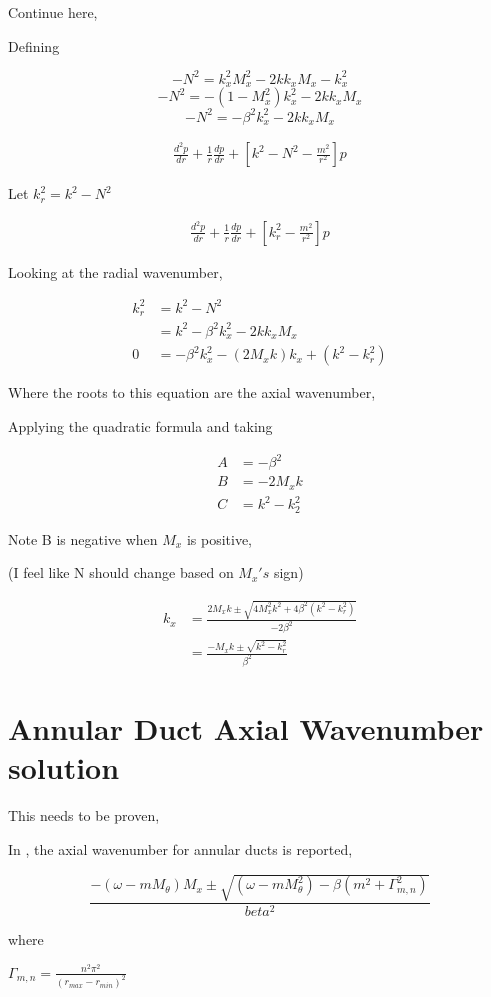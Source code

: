 Continue here,


Defining 

$$- N^2 = k_x^2 M_x^2 - 2 k k_x M_x - k_x^2 $$
$$-N^2 = -(1 -  M_x^2)k_x^2 - 2 k k_x M_x  $$
$$-N^2 =  -\beta^2 k_x^2 - 2 k k_x M_x  $$


\begin{align*}
    \frac{ d^2 p}{d r} +
    \frac{1}{r} 
    \frac{d p}{d r} + \left[ 
    k^2 - N^2 - \frac{m^2}{r^2}  \right]p 
\end{align*}

Let $k_r^2 = k^2 - N^2$


\begin{align*}
    \frac{ d^2 p}{d r} +
    \frac{1}{r} 
    \frac{d p}{d r} + \left[ 
    k_r^2  - \frac{m^2}{r^2}  \right]p 
\end{align*}

Looking at the radial wavenumber,

\begin{align*}
    k_r^2 &= k^2 - N^2 \\
          &= k^2-\beta^2 k_x^2 - 2 k k_x M_x \\
    0 &=  -\beta ^2 k_x ^2 -  \left( 2M_x k \right)k_x +(k^2 - k_r^2)
\end{align*}

Where the roots to this equation are the axial wavenumber,


Applying the quadratic formula and taking 

\begin{align*}
    A &= - \beta^2 \\
    B &= - 2M_x k\\
    C &= k^2 - k_2^2
\end{align*} 

Note B is negative when $M_x$ is positive,

(I feel like N should change based on $M_x's$ sign)

\begin{align*}
    k_x &= \frac{2M_x k \pm \sqrt{4 M_x^2 k^2 + 4 \beta^2 \left( k^2 - k_r^2 \right)}}{-2\beta^2}\\
        &= \frac{-M_x k \pm \sqrt{k^2 - k_r^2}}{\beta^2}
\end{align*}

\section{Annular Duct Axial Wavenumber solution}



This needs to be proven,


In \cite{Amr2001}, the axial wavenumber for annular ducts is reported,

\begin{equation*}
    \frac{-(\omega - m M_{\theta})M_x \pm \sqrt{\left( \omega - m M_{\theta}^2 \right) - \beta\left( m^2 + \Gamma_{m,n} ^2 \right)}}{beta^2}
\end{equation*}

where 

$\Gamma_{m,n}= \frac{n^2 \pi^2}{\left( r_{max} - r_{min} \right)^2}$

%
%


